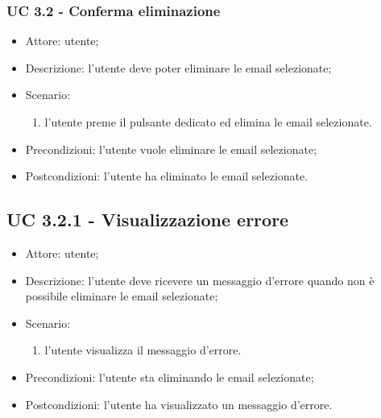     \subsubsection{UC 3.2 - Conferma eliminazione} \label{sec: UC 3.2}
    \begin{itemize}
        \item Attore: utente;
        \item Descrizione: l'utente deve poter eliminare le email selezionate;
        \item Scenario:
        \begin{enumerate}
        \item l'utente preme il pulsante dedicato ed elimina le email selezionate.
        \end{enumerate}
        \item Precondizioni: l'utente vuole eliminare le email selezionate;
        \item Postcondizioni: l'utente ha eliminato le email selezionate.
    \end{itemize}

    \subsection{UC 3.2.1 - Visualizzazione errore} \label{sec: UC 3.2.1}
    \begin{itemize}
        \item Attore: utente;
        \item Descrizione: l'utente deve ricevere un messaggio d'errore quando non è possibile eliminare le email selezionate;
        \item Scenario:
        \begin{enumerate}
        \item l'utente visualizza il messaggio d'errore.
        \end{enumerate}
        \item Precondizioni: l'utente sta eliminando le email selezionate;
        \item Postcondizioni: l'utente ha visualizzato un messaggio d'errore.
    \end{itemize}

